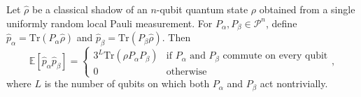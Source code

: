 \begin{lemma}
    \label{lemma:second_moments}
    Let $\hat{\rho}$ be a classical shadow of an $n$-qubit quantum state $\rho$ obtained from a single uniformly random local Pauli measurement. For $P_\alpha, P_\beta \in \mathcal{P}^n$, define $\hat{p}_\alpha=\mathrm{Tr}(P_\alpha\hat{\rho})$ and $\hat{p}_\beta=\mathrm{Tr}(P_\beta\hat{\rho})$. Then
    \begin{equation}
        \mathbb{E}\left[\hat{p}_\alpha \hat{p}_\beta
        \right]=\begin{cases}
        3^L\mathrm{Tr}(\rho P_\alpha P_\beta) & \text{if $P_\alpha$ and $P_\beta$ commute on every qubit}\\
        0 &\text{otherwise}
        \end{cases},
    \end{equation}
    where $L$ is the number of qubits on which both $P_\alpha$ and $P_\beta$ act nontrivially.
\end{lemma}
